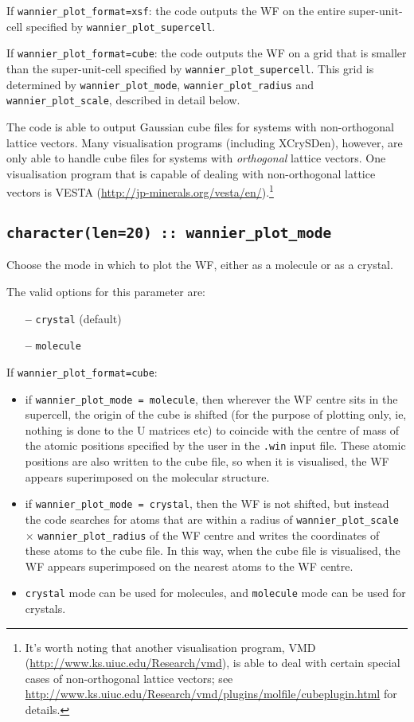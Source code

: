 If {\tt wannier\_plot\_format=xsf}: the code outputs the WF on the entire super-unit-cell
specified by {\tt wannier\_plot\_supercell}.

If {\tt wannier\_plot\_format=cube}: the code outputs the WF on a grid that is smaller
than the super-unit-cell specified by {\tt wannier\_plot\_supercell}. This grid is
determined by {\tt wannier\_plot\_mode}, {\tt wannier\_plot\_radius} and {\tt wannier\_plot\_scale},
described in detail below.

The code is able to output Gaussian cube files for systems with non-orthogonal lattice vectors.
Many visualisation programs (including XCrySDen), however, are only able to handle cube files for systems
with \emph{orthogonal} lattice vectors. One visualisation program that is capable of dealing with non-orthogonal lattice vectors is
VESTA (\url{http://jp-minerals.org/vesta/en/}).\footnote{It's worth noting that another
  visualisation program, VMD (\url{http://www.ks.uiuc.edu/Research/vmd}), is able to
  deal with certain special cases of non-orthogonal lattice
  vectors; see \url{http://www.ks.uiuc.edu/Research/vmd/plugins/molfile/cubeplugin.html} for details.}

\subsection[wannier\_plot\_mode]{\tt character(len=20) :: wannier\_plot\_mode}

Choose the mode in which to plot the WF, either as a molecule
or as a crystal.

The valid options for this parameter are:
\begin{itemize}
\item[{\bf --}] \verb#crystal# (default)
\item[{\bf --}] \verb#molecule#
\end{itemize}

If {\tt wannier\_plot\_format=cube}:
\begin{itemize}
\item if {\tt wannier\_plot\_mode = molecule}, then wherever the WF centre sits in the supercell, the origin of the cube is shifted (for the purpose of plotting only, ie, nothing is done to the U matrices etc) to coincide with the centre of mass of the atomic positions specified by the user in the {\tt *.win} input file. These atomic positions are also written to the cube file, so when it is visualised, the WF appears superimposed on the molecular structure.
\item if {\tt wannier\_plot\_mode = crystal}, then the WF is not shifted, but instead the code searches for atoms that are within a radius of {\tt wannier\_plot\_scale} $\times$ {\tt wannier\_plot\_radius} of the WF centre and writes the coordinates of these atoms to the cube file. In this way, when the cube file is visualised, the WF appears superimposed on the nearest atoms to the WF centre.
\item {\tt crystal} mode can be used for molecules, and {\tt molecule} mode can be used for crystals.
\end{itemize}

